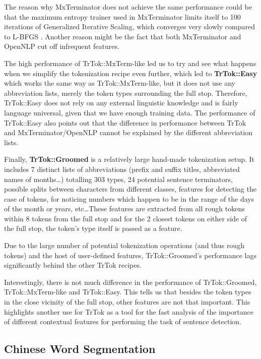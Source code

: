 The reason why MxTerminator does not achieve the same performance
could be that the maximum entropy trainer used in MxTerminator limits
itself to 100 iterations of Generalized Iterative Scaling, which
converges very slowly compared to L-BFGS \cite{maxent-algorithms}.
Another reason might be the fact that both MxTerminator and OpenNLP
cut off infrequent features.

The high performance of TrTok::MxTerm-like led us to try and see what
happens when we simplify the tokenization recipe even further, which
led to \textbf{TrTok::Easy} which works the same way as
TrTok::MxTerm-like, but it does not use any abbreviation lists, merely
the token types surrounding the full stop. Therefore, TrTok::Easy does
not rely on any external linguistic knowledge and is fairly language
universal, given that we have enough training data. The performance of
TrTok::Easy also points out that the difference in performance between
TrTok and MxTerminator/OpenNLP cannot be explained by the different
abbreviation lists.

Finally, \textbf{TrTok::Groomed} is a relatively large hand-made
tokenization setup. It includes 7 distinct lists of abbreviations
(prefix and suffix titles, abbreviated names of months\ldots)
totalling 303 types, 24 potential sentence terminators, possible
splits between characters from different classes, features for
detecting the case of tokens, for noticing numbers which happen to be
in the range of the days of the month or years, etc\ldots These
features are extracted from all rough tokens within 8 tokens from the
full stop and for the 2 closest tokens on either side of the full
stop, the token's type itself is passed as a feature.

Due to the large number of potential tokenization operations (and thus
rough tokens) and the host of user-defined features, TrTok::Groomed's
performance lags significantly behind the other TrTok recipes.

Interestingly, there is not much difference in the performance of
TrTok::Groomed, TrTok::MxTerm-like and TrTok::Easy. This tells us that
besides the token types in the close vicinity of the full stop, other
features are not that important. This highlights another use for TrTok
as a tool for the fast analysis of the importance of different
contextual features for performing the task of sentence detection.

\subsection{Chinese Word Segmentation}

